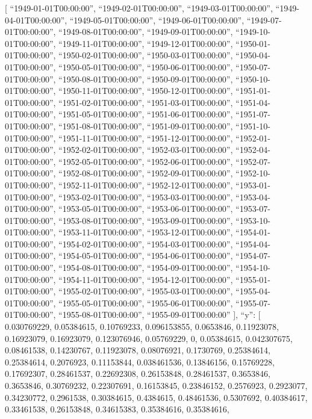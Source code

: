 \documentclass[
]{article}
\begin{document}
{[} ``1949-01-01T00:00:00'', ``1949-02-01T00:00:00'',
``1949-03-01T00:00:00'', ``1949-04-01T00:00:00'',
``1949-05-01T00:00:00'', ``1949-06-01T00:00:00'',
``1949-07-01T00:00:00'', ``1949-08-01T00:00:00'',
``1949-09-01T00:00:00'', ``1949-10-01T00:00:00'',
``1949-11-01T00:00:00'', ``1949-12-01T00:00:00'',
``1950-01-01T00:00:00'', ``1950-02-01T00:00:00'',
``1950-03-01T00:00:00'', ``1950-04-01T00:00:00'',
``1950-05-01T00:00:00'', ``1950-06-01T00:00:00'',
``1950-07-01T00:00:00'', ``1950-08-01T00:00:00'',
``1950-09-01T00:00:00'', ``1950-10-01T00:00:00'',
``1950-11-01T00:00:00'', ``1950-12-01T00:00:00'',
``1951-01-01T00:00:00'', ``1951-02-01T00:00:00'',
``1951-03-01T00:00:00'', ``1951-04-01T00:00:00'',
``1951-05-01T00:00:00'', ``1951-06-01T00:00:00'',
``1951-07-01T00:00:00'', ``1951-08-01T00:00:00'',
``1951-09-01T00:00:00'', ``1951-10-01T00:00:00'',
``1951-11-01T00:00:00'', ``1951-12-01T00:00:00'',
``1952-01-01T00:00:00'', ``1952-02-01T00:00:00'',
``1952-03-01T00:00:00'', ``1952-04-01T00:00:00'',
``1952-05-01T00:00:00'', ``1952-06-01T00:00:00'',
``1952-07-01T00:00:00'', ``1952-08-01T00:00:00'',
``1952-09-01T00:00:00'', ``1952-10-01T00:00:00'',
``1952-11-01T00:00:00'', ``1952-12-01T00:00:00'',
``1953-01-01T00:00:00'', ``1953-02-01T00:00:00'',
``1953-03-01T00:00:00'', ``1953-04-01T00:00:00'',
``1953-05-01T00:00:00'', ``1953-06-01T00:00:00'',
``1953-07-01T00:00:00'', ``1953-08-01T00:00:00'',
``1953-09-01T00:00:00'', ``1953-10-01T00:00:00'',
``1953-11-01T00:00:00'', ``1953-12-01T00:00:00'',
``1954-01-01T00:00:00'', ``1954-02-01T00:00:00'',
``1954-03-01T00:00:00'', ``1954-04-01T00:00:00'',
``1954-05-01T00:00:00'', ``1954-06-01T00:00:00'',
``1954-07-01T00:00:00'', ``1954-08-01T00:00:00'',
``1954-09-01T00:00:00'', ``1954-10-01T00:00:00'',
``1954-11-01T00:00:00'', ``1954-12-01T00:00:00'',
``1955-01-01T00:00:00'', ``1955-02-01T00:00:00'',
``1955-03-01T00:00:00'', ``1955-04-01T00:00:00'',
``1955-05-01T00:00:00'', ``1955-06-01T00:00:00'',
``1955-07-01T00:00:00'', ``1955-08-01T00:00:00'',
``1955-09-01T00:00:00'' {]}, ``y'': {[} 0.030769229, 0.05384615,
0.10769233, 0.096153855, 0.0653846, 0.11923078, 0.16923079, 0.16923079,
0.123076946, 0.05769229, 0, 0.05384615, 0.042307675, 0.08461538,
0.14230767, 0.11923078, 0.08076921, 0.1730769, 0.25384614, 0.25384614,
0.2076923, 0.11153844, 0.038461536, 0.13846156, 0.15769228, 0.17692307,
0.28461537, 0.22692308, 0.26153848, 0.28461537, 0.3653846, 0.3653846,
0.30769232, 0.22307691, 0.16153845, 0.23846152, 0.2576923, 0.2923077,
0.34230772, 0.2961538, 0.30384615, 0.4384615, 0.48461536, 0.5307692,
0.40384617, 0.33461538, 0.26153848, 0.34615383, 0.35384616, 0.35384616,
\end{document}

